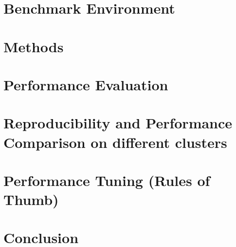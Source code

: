 \documentclass[review]{elsarticle}
\begin{document}
\section{Benchmark Environment}


\section{Methods}


\section{Performance Evaluation}


\section{Reproducibility and Performance Comparison on different clusters}


\section{Performance Tuning (Rules of Thumb)}


\section{Conclusion}

\end{document}
